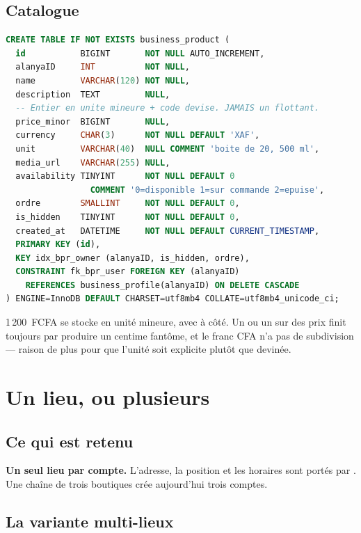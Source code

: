 \section{Catalogue}

\begin{lstlisting}[language=SQL, caption={Produits}]
CREATE TABLE IF NOT EXISTS business_product (
  id           BIGINT       NOT NULL AUTO_INCREMENT,
  alanyaID     INT          NOT NULL,
  name         VARCHAR(120) NOT NULL,
  description  TEXT         NULL,
  -- Entier en unite mineure + code devise. JAMAIS un flottant.
  price_minor  BIGINT       NULL,
  currency     CHAR(3)      NOT NULL DEFAULT 'XAF',
  unit         VARCHAR(40)  NULL COMMENT 'boite de 20, 500 ml',
  media_url    VARCHAR(255) NULL,
  availability TINYINT      NOT NULL DEFAULT 0
                 COMMENT '0=disponible 1=sur commande 2=epuise',
  ordre        SMALLINT     NOT NULL DEFAULT 0,
  is_hidden    TINYINT      NOT NULL DEFAULT 0,
  created_at   DATETIME     NOT NULL DEFAULT CURRENT_TIMESTAMP,
  PRIMARY KEY (id),
  KEY idx_bpr_owner (alanyaID, is_hidden, ordre),
  CONSTRAINT fk_bpr_user FOREIGN KEY (alanyaID)
    REFERENCES business_profile(alanyaID) ON DELETE CASCADE
) ENGINE=InnoDB DEFAULT CHARSET=utf8mb4 COLLATE=utf8mb4_unicode_ci;
\end{lstlisting}

\begin{alerte}
1\,200~FCFA se stocke  en unité mineure, avec  à côté. Un
 ou un  sur des prix finit toujours par produire un centime
fantôme, et le franc CFA n'a pas de subdivision --- raison de plus pour que l'unité soit
explicite plutôt que devinée.
\end{alerte}

\chapter{Un lieu, ou plusieurs}

\section{Ce qui est retenu}

\textbf{Un seul lieu par compte.} L'adresse, la position et les horaires sont portés par
. Une chaîne de trois boutiques crée aujourd'hui trois comptes.

\section{La variante multi-lieux}

